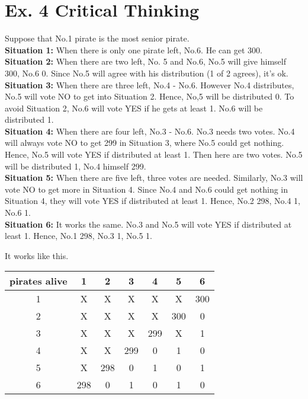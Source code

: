 \documentclass[12pt,a4paper]{article}
\theoremstyle{definition}
\begin{document}
\section{Ex. 4 Critical Thinking}
Suppose that No.1 pirate is the most senior pirate. \\
\textbf{Situation 1:} When there is only one pirate left, No.6. He can get 300. \\
\textbf{Situation 2:} When there are two left, No. 5 and No.6, No.5 will give himself 300, No.6 0. Since No.5 will agree with his distribution (1 of 2 agrees), it's ok. \\
\textbf{Situation 3:} When there are three left, No.4 - No.6. However No.4 distributes, No.5 will vote NO to get into Situation 2. Hence, No,5 will be distributed 0. To avoid Situation 2, No.6 will vote YES if he gets at least 1. No.6 will be distributed 1.\\
\textbf{Situation 4:} When there are four left, No.3 - No.6. No.3 needs two votes. No.4 will always vote NO to get 299 in Situation 3, where No.5 could get nothing. Hence, No.5 will vote YES if distributed at least 1. Then here are two votes. No.5 will be distributed 1, No.4 himself 299. \\
\textbf{Situation 5:} When there are five left, three votes are needed. Similarly, No.3 will vote NO to get more in Situation 4. Since No.4 and No.6 could get nothing in Situation 4, they will vote YES if distributed at least 1. Hence, No.2 298, No.4 1, No.6 1. \\
\textbf{Situation 6:} It works the same. No.3 and No.5 will vote YES if distributed at least 1. Hence, No.1 298, No.3 1, No.5 1.

It works like this.
\begin{table}[!htbp]
  \centering
  \begin{tabular}{|c|c|c|c|c|c|c|}
  \hline
  pirates alive & 1 & 2 & 3 & 4 & 5 & 6 \\ \hline
  1 & X & X & X & X & X & 300 \\
  2 & X & X & X & X & 300 & 0\\
  3 & X & X & X & 299 & X & 1 \\
  4 & X & X & 299 & 0 & 1 & 0 \\
  5 & X & 298 & 0 & 1 & 0 & 1 \\
  6 & 298 & 0 & 1 & 0 & 1 & 0 \\
  \hline
  \end{tabular}
  \end{table}
\end{document}
